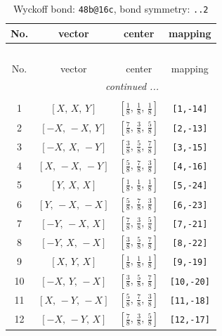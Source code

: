 \documentclass[fleqn,8pt]{jsarticle}
\begin{document}
\renewcommand{\arraystretch}{1.2}
\begin{longtable}{cccc}
\caption{Wyckoff bond: {\tt 48b@16c}, bond symmetry: {\tt ..2}}
 \\
 \hline \hline
No. & vector & center & mapping \\ \hline \endfirsthead

\multicolumn{3}{l}{\tablename\ \thetable{}} \\
 \hline \hline
No. & vector & center & mapping \\ \hline \endhead

 \hline \hline
\multicolumn{3}{r}{\footnotesize\it continued ...} \\ \endfoot

 \hline \hline
\multicolumn{3}{r}{} \\ \endlastfoot

1 & $\left[ X,\, X,\, Y \right]$ & $\left[ \frac{1}{8},\, \frac{1}{8},\, \frac{1}{8} \right]$ & {\tt [1,-14]} \\ \hline
2 & $\left[ - X,\, - X,\, Y \right]$ & $\left[ \frac{7}{8},\, \frac{3}{8},\, \frac{5}{8} \right]$ & {\tt [2,-13]} \\ \hline
3 & $\left[ - X,\, X,\, - Y \right]$ & $\left[ \frac{3}{8},\, \frac{5}{8},\, \frac{7}{8} \right]$ & {\tt [3,-15]} \\ \hline
4 & $\left[ X,\, - X,\, - Y \right]$ & $\left[ \frac{5}{8},\, \frac{7}{8},\, \frac{3}{8} \right]$ & {\tt [4,-16]} \\ \hline
5 & $\left[ Y,\, X,\, X \right]$ & $\left[ \frac{1}{8},\, \frac{1}{8},\, \frac{1}{8} \right]$ & {\tt [5,-24]} \\ \hline
6 & $\left[ Y,\, - X,\, - X \right]$ & $\left[ \frac{5}{8},\, \frac{7}{8},\, \frac{3}{8} \right]$ & {\tt [6,-23]} \\ \hline
7 & $\left[ - Y,\, - X,\, X \right]$ & $\left[ \frac{7}{8},\, \frac{3}{8},\, \frac{5}{8} \right]$ & {\tt [7,-21]} \\ \hline
8 & $\left[ - Y,\, X,\, - X \right]$ & $\left[ \frac{3}{8},\, \frac{5}{8},\, \frac{7}{8} \right]$ & {\tt [8,-22]} \\ \hline
9 & $\left[ X,\, Y,\, X \right]$ & $\left[ \frac{1}{8},\, \frac{1}{8},\, \frac{1}{8} \right]$ & {\tt [9,-19]} \\ \hline
10 & $\left[ - X,\, Y,\, - X \right]$ & $\left[ \frac{3}{8},\, \frac{5}{8},\, \frac{7}{8} \right]$ & {\tt [10,-20]} \\ \hline
11 & $\left[ X,\, - Y,\, - X \right]$ & $\left[ \frac{5}{8},\, \frac{7}{8},\, \frac{3}{8} \right]$ & {\tt [11,-18]} \\ \hline
12 & $\left[ - X,\, - Y,\, X \right]$ & $\left[ \frac{7}{8},\, \frac{3}{8},\, \frac{5}{8} \right]$ & {\tt [12,-17]} \\
\end{longtable}
\end{document}
